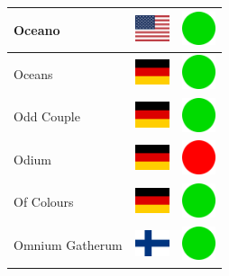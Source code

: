 \documentclass[12pt, a4paper, twoside]{report}
\begin{document}
\begin{center}
\begin{longtable}{|p{5cm}|p{2cm}|p{2cm}|}
 Oceano                                                     & \includegraphics[width=1cm]{../img/flags/us} &   \includegraphics[width=1cm]{../likes/y} \\ \hline
 Oceans                                                     & \includegraphics[width=1cm]{../img/flags/de} &   \includegraphics[width=1cm]{../likes/y} \\ \hline
 Odd Couple                                                 & \includegraphics[width=1cm]{../img/flags/de} &   \includegraphics[width=1cm]{../likes/y} \\ \hline
 Odium                                                      & \includegraphics[width=1cm]{../img/flags/de} &   \includegraphics[width=1cm]{../likes/n} \\ \hline
 Of Colours                                                 & \includegraphics[width=1cm]{../img/flags/de} &   \includegraphics[width=1cm]{../likes/y} \\ \hline
 Omnium Gatherum                                            & \includegraphics[width=1cm]{../img/flags/fi} &   \includegraphics[width=1cm]{../likes/y} \\ \hline

\end{longtable}
\end{center}
\end{document}
